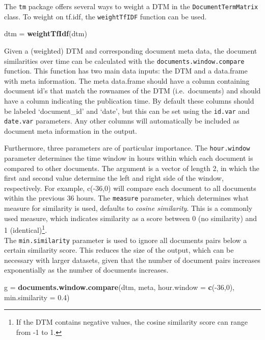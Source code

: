 \documentclass[]{article}
\newenvironment{Shaded}{\begin{snugshade}}{\end{snugshade}}
\newcommand{\KeywordTok}[1]{\textcolor[rgb]{0.13,0.29,0.53}{\textbf{{#1}}}}
\newcommand{\DataTypeTok}[1]{\textcolor[rgb]{0.13,0.29,0.53}{{#1}}}
\newcommand{\DecValTok}[1]{\textcolor[rgb]{0.00,0.00,0.81}{{#1}}}
\newcommand{\FloatTok}[1]{\textcolor[rgb]{0.00,0.00,0.81}{{#1}}}
\newcommand{\StringTok}[1]{\textcolor[rgb]{0.31,0.60,0.02}{{#1}}}
\newcommand{\NormalTok}[1]{{#1}}
\let\rmarkdownfootnote\footnote%
\def\footnote{\protect\rmarkdownfootnote}
\begin{document}
The \texttt{tm} package offers several ways to weight a DTM in the
\texttt{DocumentTermMatrix} class. To weight on tf.idf, the
\texttt{weightTfIDF} function can be used.

\begin{Shaded}
\begin{Highlighting}[]
\NormalTok{dtm =}\StringTok{ }\KeywordTok{weightTfIdf}\NormalTok{(dtm)}
\end{Highlighting}
\end{Shaded}

Given a (weighted) DTM and corresponding document meta data, the
document similarities over time can be calculated with the
\texttt{documents.window.compare} function. This function has two main
data inputs: the DTM and a data.frame with meta information. The meta
data.frame should have a column containing document id's that match the
rownames of the DTM (i.e.~documents) and should have a column indicating
the publication time. By default these columns should be labeled
`document\_id' and `date', but this can be set using the \texttt{id.var}
and \texttt{date.var} parameters. Any other columns will automatically
be included as document meta information in the output.

Furthermore, three parameters are of particular importance. The
\texttt{hour.window} parameter determines the time window in hours
within which each document is compared to other documents. The argument
is a vector of length 2, in which the first and second value determine
the left and right side of the window, respectively. For example,
c(-36,0) will compare each document to all documents within the previous
36 hours. The \texttt{measure} parameter, which determines what measure
for similarity is used, defaults to \emph{cosine similarity}. This is a
commonly used measure, which indicates similarity as a score between 0
(no similarity) and 1 (identical)\footnote{If the DTM contains negative
  values, the cosine similarity score can range from -1 to 1.}.\\The
\texttt{min.similarity} parameter is used to ignore all documents pairs
below a certain similarity score. This reduces the size of the output,
which can be necessary with larger datasets, given that the number of
document pairs increases exponentially as the number of documents
increases.

\begin{Shaded}
\begin{Highlighting}[]
\NormalTok{g =}\StringTok{ }\KeywordTok{documents.window.compare}\NormalTok{(dtm, meta,}
                             \DataTypeTok{hour.window =} \KeywordTok{c}\NormalTok{(-}\DecValTok{36}\NormalTok{,}\DecValTok{0}\NormalTok{), }
                             \DataTypeTok{min.similarity =} \FloatTok{0.4}\NormalTok{)}
\end{Highlighting}
\end{Shaded}
\end{document}
